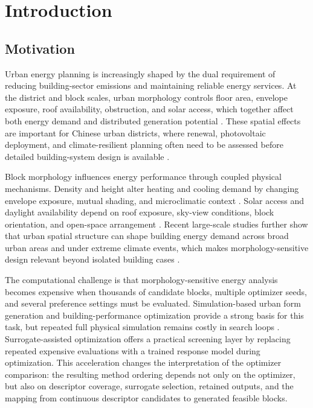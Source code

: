 \documentclass[final,3p,times,numbers,sort&compress]{elsarticle}
\newif\ifshowrevision
\newenvironment{revblock}{%
  \ifshowrevision\color{revisionblue}\fi%
}{}
\begin{document}
\section{Introduction}
\label{sec:introduction}

\begin{revblock}
\subsection{Motivation}

Urban energy planning is increasingly shaped by the dual requirement of reducing building-sector emissions and maintaining reliable energy services. At the district and block scales, urban morphology controls floor area, envelope exposure, roof availability, obstruction, and solar access, which together affect both energy demand and distributed generation potential \cite{ref1,ref2}. These spatial effects are important for Chinese urban districts, where renewal, photovoltaic deployment, and climate-resilient planning often need to be assessed before detailed building-system design is available \cite{ref6,ref7}.

Block morphology influences energy performance through coupled physical mechanisms. Density and height alter heating and cooling demand by changing envelope exposure, mutual shading, and microclimatic context \cite{ref3,ref4}. Solar access and daylight availability depend on roof exposure, sky-view conditions, block orientation, and open-space arrangement \cite{ref5,ref41}. Recent large-scale studies further show that urban spatial structure can shape building energy demand across broad urban areas and under extreme climate events, which makes morphology-sensitive design relevant beyond isolated building cases \cite{wang2026unlocking,wang2026climateResilient}.

The computational challenge is that morphology-sensitive energy analysis becomes expensive when thousands of candidate blocks, multiple optimizer seeds, and several preference settings must be evaluated. Simulation-based urban form generation and building-performance optimization provide a strong basis for this task, but repeated full physical simulation remains costly in search loops \cite{ref8,ref18}. Surrogate-assisted optimization offers a practical screening layer by replacing repeated expensive evaluations with a trained response model during optimization. This acceleration changes the interpretation of the optimizer comparison: the resulting method ordering depends not only on the optimizer, but also on descriptor coverage, surrogate selection, retained outputs, and the mapping from continuous descriptor candidates to generated feasible blocks.


\end{revblock}
\end{document}
